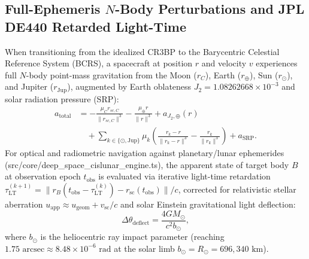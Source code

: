 \documentclass[11pt,a4paper,reqno]{article}
\def\bm#1{#1}%
\def\texttt#1{#1}%
\def\mathbb#1{#1}%
\theoremstyle{plain}
\theoremstyle{definition}
\theoremstyle{remark}
\numberwithin{equation}{section}
\begin{document}
\subsection{Full-Ephemeris \texorpdfstring{$N$}{N}-Body Perturbations and JPL DE440 Retarded Light-Time}
When transitioning from the idealized CR3BP to the Barycentric Celestial Reference System (BCRS), a spacecraft at position $\bm{r}$ and velocity $\bm{v}$ experiences full $N$-body point-mass gravitation from the Moon ($\bm{r}_{\mathbb{C}}$), Earth ($\bm{r}_\oplus$), Sun ($\bm{r}_\odot$), and Jupiter ($\bm{r}_{\text{Jup}}$), augmented by Earth oblateness $J_2 = 1.08262668 \times 10^{-3}$ and solar radiation pressure (SRP):
\begin{equation}
\begin{aligned}
  \bm{a}_{\text{total}} &= -\frac{\mu_{\mathbb{C}} \bm{r}_{sc,\mathbb{C}}}{\|\bm{r}_{sc,\mathbb{C}}\|^3} - \frac{\mu_\oplus \bm{r}}{\|\bm{r}\|^3} + \bm{a}_{J_2,\oplus}(\bm{r}) \\
  &\quad + \sum_{k \in \{\odot, \text{Jup}\}} \mu_k \left( \frac{\bm{r}_k - \bm{r}}{\|\bm{r}_k - \bm{r}\|^3} - \frac{\bm{r}_k}{\|\bm{r}_k\|^3} \right) + \bm{a}_{\text{SRP}}.
\end{aligned}
  \label{eq:nrho_full_accel}
\end{equation}
For optical and radiometric navigation against planetary/lunar ephemerides (\texttt{src/core/deep\_space\_cislunar\_engine.ts}), the apparent state of target body $B$ at observation epoch $t_{\text{obs}}$ is evaluated via iterative light-time retardation $\tau_{\text{LT}}^{(k+1)} = \|\bm{r}_B(t_{\text{obs}} - \tau_{\text{LT}}^{(k)}) - \bm{r}_{\text{sc}}(t_{\text{obs}})\| / c$, corrected for relativistic stellar aberration $\bm{u}_{\text{app}} \approx \bm{u}_{\text{geom}} + \bm{v}_{\text{sc}}/c$ and solar Einstein gravitational light deflection:
\begin{equation}
  \Delta\theta_{\text{deflect}} = \frac{4 G M_\odot}{c^2 b_\odot},
  \label{eq:einstein_deflection}
\end{equation}
where $b_\odot$ is the heliocentric ray impact parameter (reaching $1.75\text{ arcsec} \approx 8.48 \times 10^{-6}\text{ rad}$ at the solar limb $b_\odot = R_\odot = 696,340\text{ km}$).
\end{document}
